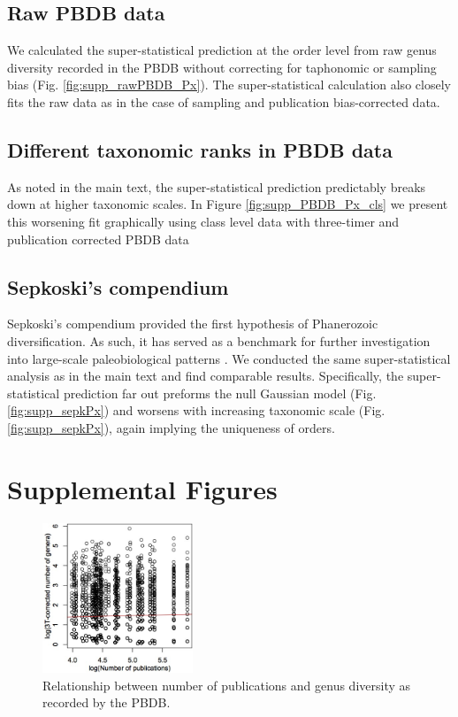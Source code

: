\documentclass[12pt]{article}
\let\citep=\autocite
\begin{document}
\subsection{Raw PBDB data} \label{sec:rawPBDB}
We calculated the super-statistical prediction at the order level from
raw genus diversity recorded in the PBDB without correcting for
taphonomic or sampling bias (Fig. \ref{fig:supp_rawPBDB_Px}). The
super-statistical calculation also closely fits the raw data as in the
case of sampling and publication bias-corrected data.

\subsection{Different taxonomic ranks in PBDB data}
As noted in the main text, the super-statistical prediction
predictably breaks down at higher taxonomic scales. In Figure
\ref{fig:supp_PBDB_Px_cls} we present this worsening fit graphically
using class level data with three-timer and publication corrected PBDB
data

\subsection{Sepkoski's compendium} \label{sec:suppSepk}
Sepkoski's compendium \citep{sepkoski1992} provided the first
hypothesis of Phanerozoic diversification.  As such, it has served as
a benchmark for further investigation into large-scale paleobiological
patterns \citep{alroy08}.  We conducted the same super-statistical
analysis as in the main text and find comparable results.
Specifically, the super-statistical prediction far out preforms the
null Gaussian model (Fig. \ref{fig:supp_sepkPx}) and worsens with
increasing taxonomic scale (Fig. \ref{fig:supp_sepkPx}), again
implying the uniqueness of orders.

\printbibliography

\clearpage

\section*{Supplemental Figures}

\begin{figure}[!hp]
  \centering
  \includegraphics[width=0.4\textwidth]{figs/figSupp_divByPub.jpg}
  \caption[Relationship between number of publications and genus
  diversity]{Relationship between number of publications and genus
    diversity as recorded by the PBDB.}
  \label{fig:divByPub}
\end{figure}
\end{document}

